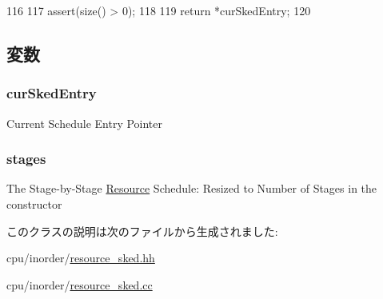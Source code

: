 \begin{DoxyCode}
116 {
117     assert(size() > 0);
118 
119     return *curSkedEntry;
120 }
\end{DoxyCode}


\subsection{変数}
\hypertarget{classResourceSked_a776f518c901720e43d62f12f8d1cad70}{
\subsubsection[{curSkedEntry}]{ {\bf curSkedEntry}}}
\label{classResourceSked_a776f518c901720e43d62f12f8d1cad70}
Current Schedule Entry Pointer \hypertarget{classResourceSked_aacb3efd7714ef0cabf149e417086ad56}{
\subsubsection[{stages}]{ {\bf stages}}}
\label{classResourceSked_aacb3efd7714ef0cabf149e417086ad56}
The Stage-\/by-\/Stage \hyperlink{classResource}{Resource} Schedule: Resized to Number of Stages in the constructor 

このクラスの説明は次のファイルから生成されました:\begin{DoxyCompactItemize}
\item 
cpu/inorder/\hyperlink{resource__sked_8hh}{resource\_\-sked.hh}\item 
cpu/inorder/\hyperlink{resource__sked_8cc}{resource\_\-sked.cc}\end{DoxyCompactItemize}
